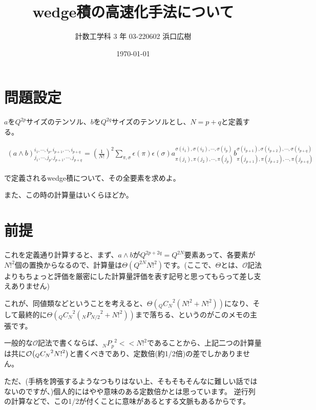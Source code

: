 \documentclass[a4paper, 10pt, dvipdfmx]{jlreq}
\begin{document}
\title{wedge積の高速化手法について}
\author{計数工学科 3 年 03-220602 浜口広樹}
\date{\today}
\maketitle

\section{問題設定}

$a$を$Q^{2p}$サイズのテンソル、$b$を$Q^{2q}$サイズのテンソルとし、$N=p+q$と定義する。

\begin{align*}
    \left( a \wedge b\right) ^{i_{1}, \cdots, i_{p}, i_{p+1},\cdots, i_{p+q}}_{j_{1}, \cdots, j_{p}, j_{p+1}, \cdots, j_{p+q} } =
    \left(\frac{1}{N!}\right)^{2}
    \sum_{\pi, \sigma}
    \epsilon(\pi)
    \epsilon(\sigma)
    a_{\pi(j_{1}), \pi(j_{2}), \cdots, \pi(j_{p}) }^{ \sigma(i_{1}), \sigma(i_{2}), \cdots, \sigma(i_{p})}
    b_{\pi(j_{p+1}), \pi(j_{p+2}), \cdots, \pi(j_{p+q}) }^{ \sigma(i_{p+1}), \sigma(i_{p+2}), \cdots, \sigma(i_{p+q})}
\end{align*}

で定義されるwedge積について、その全要素を求めよ。

また、この時の計算量はいくらほどか。

\section{前提}

これを定義通り計算すると、まず、$a \wedge b$が$Q^{2p+2q}=Q^{2N}$要素あって、各要素が${N!}^2$個の置換からなるので、計算量は$\Theta\left(Q^{2N}{N!}^2\right)$です。(ここで、$\Theta$とは、$\mathcal{O}$記法よりもちょっと評価を厳密にした計算量評価を表す記号と思ってもらって差し支えありません)

これが、同値類などということを考えると、$\Theta\left({{}_Q C_N}^2\left({N!}^2+{N!}^2\right)\right)$になり、そして最終的に$\Theta\left({{}_Q C_N}^2\left({{}_N P_{N/2}}^2+{N!}^2\right)\right)$まで落ちる、というのがこのメモの主張です。

一般的な$\mathcal{O}$記法で書くならば、${{}_N P_p}^2 << {N!}^2$であることから、上記二つの計算量は共に$\order{{{}_Q C_N}^2 {N!}^2}$と書くべきであり、定数倍(約1/2倍)の差でしかありません。

ただ、(手柄を誇張するようなつもりはない上、そもそもそんなに難しい話ではないのですが、)個人的にはやや意味のある定数倍かとは思っています。
逆行列の計算などで、この1/2が付くことに意味があるとする文脈もあるからです。
\end{document}
